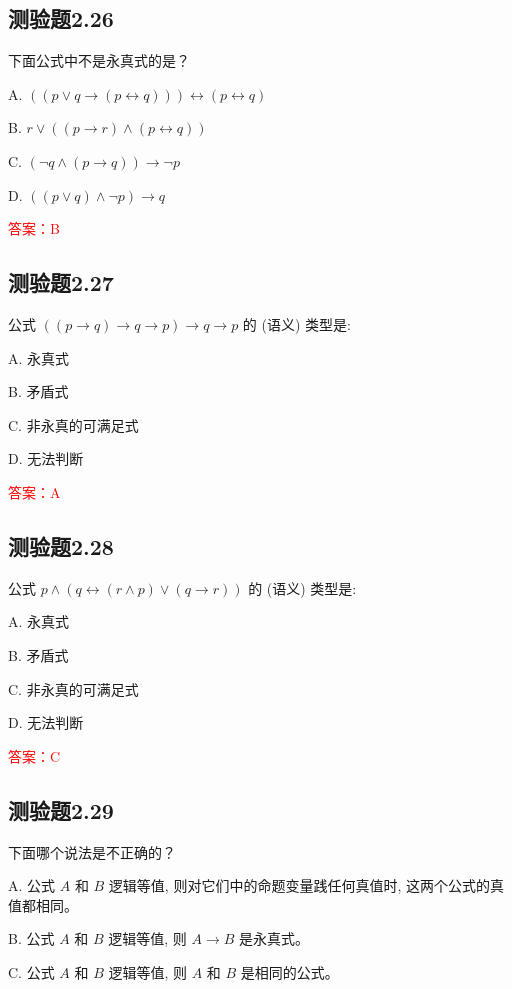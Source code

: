 \documentclass[UTF8, heading=true]{ctexart}
\begin{document}
\subsection{测验题2.26}

下面公式中不是永真式的是？

A. $((p \vee q \rightarrow(p \leftrightarrow q))) \leftrightarrow(p \leftrightarrow q)$

B. $ r \vee((p \rightarrow r) \wedge(p \leftrightarrow q))$

C. $(\neg q \wedge(p \rightarrow q)) \rightarrow \neg p$

D. $((p \vee q) \wedge \neg p) \rightarrow q$

\textcolor{red}{答案：B}

\subsection{测验题2.27}

公式 $((p \rightarrow q) \rightarrow q \rightarrow p) \rightarrow q \rightarrow p$ 的 (语义) 类型是: $\qquad$

A. 永真式

B. 矛盾式

C. 非永真的可满足式

D. 无法判断

\textcolor{red}{答案：A}

\subsection{测验题2.28}

公式 $p \wedge(q \leftrightarrow(r \wedge p) \vee(q \rightarrow r))$ 的 (语义) 类型是: $\qquad$

A. 永真式

B. 矛盾式

C. 非永真的可满足式

D. 无法判断

\textcolor{red}{答案：C}

\subsection{测验题2.29}

下面哪个说法是不正确的？

A. 公式 $A$ 和 $B$ 逻辑等值, 则对它们中的命题变量践任何真值时, 这两个公式的真值都相同。

B. 公式 $A$ 和 $B$ 逻辑等值, 则 $A \rightarrow B$ 是永真式。

C. 公式 $A$ 和 $B$ 逻辑等值, 则 $A$ 和 $B$ 是相同的公式。
\end{document}
